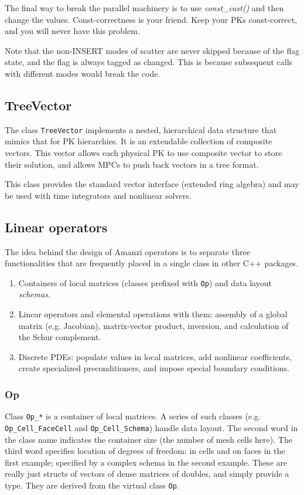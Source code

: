 The final way to break the parallel machinery is to use {\it const\_cast()} and 
then change the values.
Const-correctness is your friend. Keep your PKs const-correct, and you will never have this problem.

Note that the non-{\rm INSERT} modes of scatter are never skipped because of the flag state, 
and the flag is always tagged as changed.  
This is because subsequent calls with different modes would break the code.


\subsection{TreeVector}
The class {\tt TreeVector} implements a nested, hierarchical data structure 
that mimics that for PK hierarchies.
It is an extendable collection of composite vectors.
This vector allows each physical PK to use composite vector to store 
their solution, and allows MPCs to push back vectors in a tree format.

This class provides the standard vector interface (extended ring algebra) and 
may be used with time integrators and nonlinear solvers.


\subsection{Linear operators}
The idea behind the design of Amanzi operators is to separate three 
functionalities that are frequently placed in a single class in other
C++ packages.

\begin{enumerate}
\item Containers of local matrices (classes prefixed with {\tt Op}) and 
      data layout {\it schemas}.

\item Linear operators and elemental operations with them: assembly of a global 
      matrix (e.g. Jacobian), matrix-vector product, inversion, and calculation of the Schur complement.

\item Discrete PDEs: populate values in local matrices, add nonlinear 
coefficients, create specialized preconditioners, and impose special
boundary conditions. 
\end{enumerate}


\subsubsection{Op}
Class {\tt Op\_*} is a container of local matrices.
A series of such classes (e.g. {\tt Op\_Cell\_FaceCell} and {\tt Op\_Cell\_Schema}) handle data layout. 
The second word in the class name indicates the container size (the number of mesh cells here).
The third word specifies location of degrees of freedom: in cells and on faces in the first example;
specified by a complex schema in the second example.
These are really just structs of vectors of
dense matrices of doubles, and simply provide a type.
They are derived from the virtual class {\tt Op}.


